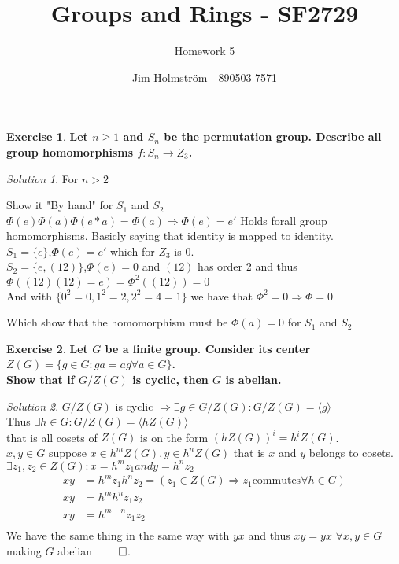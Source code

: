 \documentclass[a4paper,twoside=false,abstract=false,numbers=noenddot,
titlepage=false,headings=small,parskip=half,version=last]{scrartcl}
\author{Jim Holmström - 890503-7571}
\title{Groups and Rings - SF2729}
\subtitle{Homework 5}
\theoremstyle{definition}
\newtheorem{exercise}{Exercise}
\theoremstyle{remark}
\newtheorem*{solution}{Solution}
\begin{document}
\maketitle
\thispagestyle{empty}

\begin{exercise}
{\bf
Let $n \ge 1$ and $S_n$ be the permutation group. 
Describe all group homomorphisms $f : S_n \rightarrow Z_3$.
}
\end{exercise}
\begin{solution}

For $n>2$



Show it "By hand" for $S_1$ and $S_2$\\

$\Phi(e)\Phi(a)\Phi(e*a)=\Phi(a) \Rightarrow \Phi(e)=e'$ Holds forall group
homomorphisms. Basicly saying that identity is mapped to identity.\\
$S_1=\{e\}$,$\Phi(e)=e'$ which for $Z_3$ is 0. \\
$S_2=\{e,(1 2)\}$,$\Phi(e)=0$ and $(1 2)$ has order 2 and thus $\Phi((1 2)(1
2)=e)=\Phi^2((1 2))=0$\\
And with $\{0^2=0,1^2=2,2^2=4=1\}$ we have that $\Phi^2=0 \Rightarrow \Phi=0$

Which show that the homomorphism must be $\Phi(a)=0$ for $S_1$ and $S_2$

\end{solution}

\begin{exercise}
{\bf
Let $G$ be a  finite group. Consider its center $Z(G) = \{ g \in G : ga=ag \forall a\in G\}$.\\
Show that if $G/Z(G)$ is cyclic, then $G$ is abelian.
}
\end{exercise}
\begin{solution}
$G/Z(G)$ is cyclic $\Rightarrow \exists g \in G/Z(G) : G/Z(G) = \langle g
\rangle$\\
Thus $\exists h \in G : G/Z(G) = \langle hZ(G) \rangle$\\
that is all cosets of $Z(G)$ is on the form $(hZ(G))^i=h^iZ(G)$. \\
$x,y \in G$ suppose $x \in h^mZ(G),y \in h^nZ(G)$ that is $x$ and $y$ belongs
to cosets. $\exists z_1,z_2 \in Z(G) : x=h^mz_1 and y=h^nz_2 $\\
\begin{align*}
    xy &= h^mz_1h^nz_2 = (z_1\in Z(G) \Rightarrow z_1 \mbox{commutes} \forall h
    \in G)\\
    xy &= h^mh^nz_1z_2 \\
    xy &= h^{m+n}z_1z_2 \\
\end{align*}
We have the same thing in the same way with $yx$ and thus $xy=yx$ $\forall x,y
\in G$ making $G$ abelian $\qed$.

\end{solution}


\end{document}
